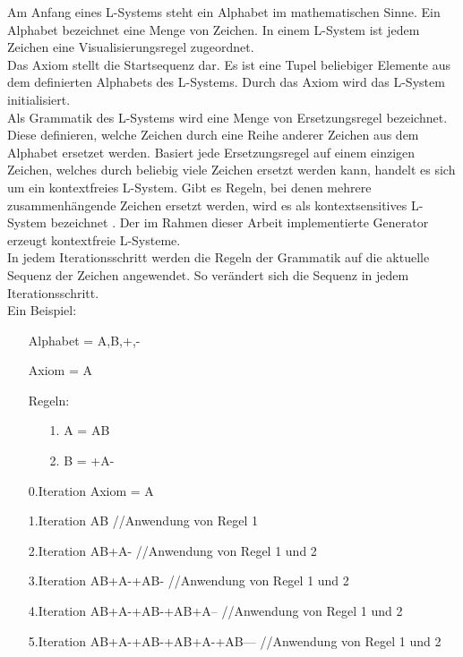 \documentclass[../mciAusarbeitung.tex]{subfiles}
\begin{document}
	Am Anfang eines L-Systems steht ein Alphabet im mathematischen Sinne. Ein Alphabet bezeichnet eine Menge von Zeichen. In einem L-System ist jedem Zeichen eine Visualisierungsregel zugeordnet.\\
	Das Axiom stellt die Startsequenz dar. Es ist eine Tupel beliebiger Elemente aus dem definierten Alphabets des L-Systems. Durch das Axiom wird das L-System initialisiert.\\
	Als Grammatik des L-Systems wird eine Menge von Ersetzungsregel bezeichnet. Diese definieren, welche Zeichen durch eine Reihe anderer Zeichen aus dem Alphabet ersetzet werden. Basiert jede Ersetzungsregel auf einem einzigen Zeichen, welches durch beliebig viele Zeichen ersetzt werden kann, handelt es sich um ein kontextfreies L-System. Gibt es Regeln, bei denen mehrere zusammenhängende Zeichen ersetzt werden, wird es als kontextsensitives L-System bezeichnet \cite{prusinkiewicz1990algorithmic}. Der im Rahmen dieser Arbeit implementierte Generator erzeugt kontextfreie L-Systeme.\\
	In jedem Iterationsschritt werden die Regeln der Grammatik auf die aktuelle Sequenz der Zeichen angewendet. So verändert sich die Sequenz in jedem Iterationsschritt.\\
	Ein Beispiel:
	\begin{itemize}
	\setlength\itemsep{-0.2em}
	\item[] Alphabet = {A,B,+,-}
	\item[] Axiom = A
	\item[] Regeln:
		\begin{itemize}
		\setlength\itemsep{-0.2em}
			\item[1.]A = AB
			\item[2.]B = +A-
		\end{itemize}
	\end{itemize}
	\begin{itemize}
	\setlength\itemsep{-0.2em}
		\item[] 0.Iteration Axiom = A 
		\item[] 1.Iteration AB \quad \quad \quad \quad \quad \quad \quad \quad \quad \quad \quad \quad \quad //Anwendung von Regel 1 
		\item[] 2.Iteration AB+A- \quad \quad \quad \quad \quad \quad \quad \quad \quad \quad \quad//Anwendung von Regel 1 und 2 
		\item[] 3.Iteration AB+A-+AB- \quad \quad \quad \quad \quad \quad \quad \quad //Anwendung von Regel 1 und 2 
		\item[] 4.Iteration AB+A-+AB-+AB+A--   \quad \quad \quad \quad  //Anwendung von Regel 1 und 2 
		\item[] 5.Iteration AB+A-+AB-+AB+A-+AB---   \quad  //Anwendung von Regel 1 und 2 
	\end{itemize}
\end{document}
